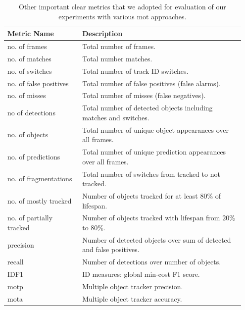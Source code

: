 \begin{table}[t]
    \centering
    \begin{tabular}{p{0.3\linewidth}p{0.65\linewidth}}
        \toprule
        \textbf{Metric Name}     & \textbf{Description}                                                 \\
        \midrule
        no. of frames            & Total number of frames.                                              \\
        no. of matches           & Total number matches.                                                \\
        no. of switches          & Total number of track ID switches.                                   \\
        no. of false positives   & Total number of false positives (false alarms).                      \\
        no. of misses            & Total number of misses (false negatives).                            \\
        no of detections         & Total number of detected objects including matches and switches.     \\
        no. of objects           & Total number of unique object appearances over all frames.           \\
        no. of predictions       & Total number of unique prediction appearances over all frames.       \\
        no. of fragmentations    & Total number of switches from tracked to not tracked.                \\
        no. of mostly tracked    & Number of objects tracked for at least $80\%$ of lifespan.           \\
        no. of partially tracked & Number of objects tracked with lifespan from $20\%$ to $80\%$.       \\
        precision                & Number of detected objects over sum of detected and false positives. \\
        recall                   & Number of detections over number of objects.                         \\
        IDF1                     & ID measures: global min-cost F1 score.                               \\
        \gls{motp}               & Multiple object tracker precision.                                   \\
        \gls{mota}               & Multiple object tracker accuracy.                                    \\
        \bottomrule
    \end{tabular}
    \caption{Other important \gls{clear} metrics that we adopted for evaluation of our experiments with various \gls{mot} approaches.}
    \label{tab:OtherCLEARMetrics}
\end{table}